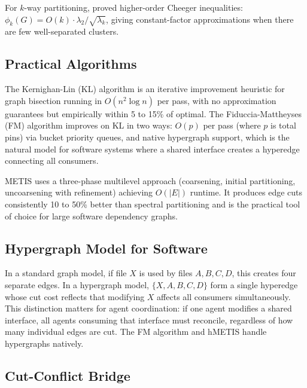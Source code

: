 \documentclass[11pt, a4paper, copyright]{googledeepmind}
\begin{document}
For $k$-way partitioning, \citet{Lee2012cheeger} proved higher-order Cheeger inequalities: $\phi_k(G) = O(k) \cdot \lambda_2 / \sqrt{\lambda_k}$, giving constant-factor approximations when there are few well-separated clusters.

\subsection{Practical Algorithms}

The Kernighan-Lin (KL) algorithm \citep{KernighanLin1970} is an iterative improvement heuristic for graph bisection running in $O(n^2 \log n)$ per pass, with no approximation guarantees but empirically within 5 to 15\% of optimal.
The Fiduccia-Mattheyses (FM) algorithm \citep{FiducciaMattheyses1982} improves on KL in two ways: $O(p)$ per pass (where $p$ is total pins) via bucket priority queues, and native hypergraph support, which is the natural model for software systems where a shared interface creates a hyperedge connecting all consumers.

METIS \citep{KarypisKumar1998} uses a three-phase multilevel approach (coarsening, initial partitioning, uncoarsening with refinement) achieving $O(|E|)$ runtime.
It produces edge cuts consistently 10 to 50\% better than spectral partitioning and is the practical tool of choice for large software dependency graphs.

\subsection{Hypergraph Model for Software}

In a standard graph model, if file $X$ is used by files $A, B, C, D$, this creates four separate edges.
In a hypergraph model, $\{X, A, B, C, D\}$ form a single hyperedge whose cut cost reflects that modifying $X$ affects all consumers simultaneously.
This distinction matters for agent coordination: if one agent modifies a shared interface, all agents consuming that interface must reconcile, regardless of how many individual edges are cut.
The FM algorithm and hMETIS handle hypergraphs natively.

\subsection{Cut-Conflict Bridge}
\end{document}
